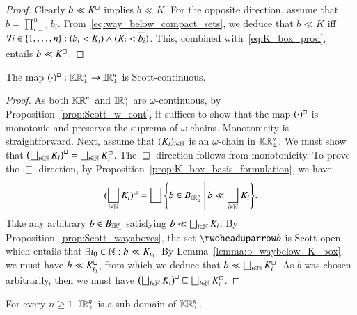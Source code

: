 \documentclass[11pt,times]{article}
\begin{document}
  \begin{proof}
    Clearly $b \ll \hbClos{K}$ implies $b \ll K$. For the opposite
    direction, assume that $b = \prod_{i=1}^n
    b_i$. From~\eqref{eq:way_below_compact_sets}, we deduce that
    $b \ll K$ iff
    $\forall i \in \set{1, \ldots, n}: (\lep[b_i] < \lep[K_i]) \wedge
    (\uep[K_i] < \uep[b_i])$. This, combined
    with~\eqref{eq:K_box_prod}, entails $b \ll \hbClos{K}$.
  \end{proof}

  \begin{corollary}
    \label{cor:box_map_scott_cont}
    The map
    $\hbClos{(\cdot)} : \kCPPO{\R^n\lift} \to \intvaldom[\R^n\lift]$
    is Scott-continuous.
  \end{corollary}


  
  \begin{proof}
    As both $\kCPPO{\R^n\lift}$ and $\intvaldom[\R^n\lift]$ are
    $\omega$-continuous, by Proposition~\ref{prop:Scott_w_cont}, it
    suffices to show that the map $\hbClos{(\cdot)}$ is monotonic and
    preserves the suprema of $\omega$-chains. Monotonicity is
    straightforward. Next, assume that $(K_i)_{i \in \N}$ is an
    $\omega$-chain in $\kCPPO{\R^n\lift}$. We must show that
    $\hbClos{\left( \lub_{i \in \N} K_i\right)} = \lub_{i \in \N}
    \hbClos{K_i}$. The $\sqsupseteq$ direction follows from
    monotonicity. To prove the $\sqsubseteq$ direction, by
    Proposition~\ref{prop:K_box_basis_formulation}, we have:
    \begin{equation*}
      \hbClos{(\lub_{i \in \N} K_i)} = \lub{\setbarTall{b \in
          B_{\intvaldom[\R^n\lift]}}{ b \ll \lub_{i \in \N} K_i}}.  
    \end{equation*}
    Take any arbitrary $b \in B_{\intvaldom[\R^n\lift]}$ satisfying
    $b \ll \lub_{i \in \N} K_i$. By
    Proposition~\ref{prop:Scott_wayaboves}, the set $\wayaboves{b}$ is
    Scott-open, which entails that
    $\exists i_0 \in \N: b \ll K_{i_0}$. By
    Lemma~\ref{lemma:b_waybelow_K_box}, we must have
    $b \ll \hbClos{K_{i_0}}$, from which we deduce that
    $b \ll \lub_{i \in \N} \hbClos{K_i}$. As $b$ was chosen
    arbitrarily, then we must have
    $\hbClos{\left( \lub_{i \in \N} K_i\right)} \sqsubseteq \lub_{i
      \in \N} \hbClos{K_i}$.
  \end{proof}


    \begin{corollary}
      \label{cor:IR_subdomain_KR}
    For every $n \geq 1$, $\intvaldom[\R^n\lift]$ is a sub-domain of
        $\kCPPO{\R^n\lift}$.
  \end{corollary}
\end{document}
